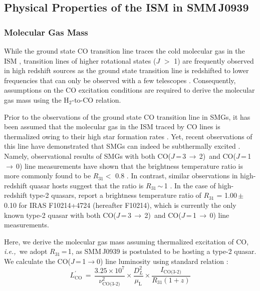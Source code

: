 \documentclass[twocolumn,apj,numberedappendix]{emulateapj}
\newcommand{\rarr}{$\rightarrow$}
\newcommand{\CO}{\mbox{CO($J$\,=\,3\,$\rightarrow$\,2) }}
\newcommand{\eg}{{\sl e.g.,~}}
\newcommand{\ie}{{\sl i.e.,~}}
\begin{document}
\subsection{Physical Properties of the ISM in SMM\,J0939}
\subsubsection{Molecular Gas Mass}
While the ground state CO transition line traces the cold molecular gas in the ISM
\citep*[\eg][]{Wilson70a,Downes98a}, transition lines of higher rotational states ($J$ $>$ 1) are frequently observed in high redshift sources as the
 ground state transition line is redshifted to lower frequencies that can only be observed with a few telescopes 
 \citep{Carilli13a}. Consequently, assumptions on the CO excitation conditions are required to derive the molecular gas mass using the H$_\textrm{2}$-to-CO 
 relation. \par
Prior to the observations of the ground state CO transition line in SMGs, it has been assumed that the molecular gas in the
  ISM traced by CO lines is thermalized owing to their high star formation rates \citep[\eg][]{Greve05a, Coppin08a}.
   Yet, recent observations of this line have demonstrated that SMGs can indeed be subthermally excited
   \citep{Harris10a,Riechers11c,Riechers11d,Ivison11a}. Namely, observational results of SMGs with both \CO and CO($J$\,=\,1\,\rarr\,0) line measurements have shown that the 
   brightness temperature ratio is more commonly found to be $R_\textrm{31}<$ 0.8 \citep
   {Harris10a,Carilli10a,Swinbank2010a,Ivison10d,Ivison11a,Riechers11d}. In contrast, similar observations in high-redshift quasar hosts suggest that the ratio 
   is $R_\textrm{31}$\,$\sim$\,1 \citep{Riechers06a, Riechers11a, Scott11a}. In the case of high-redshift type-2 quasars, \citet{Riechers11a} report a brightness temperature ratio of $R_\textrm{31}$ = 1.00\,$\pm$\,0.10 for IRAS F10214+4724 (hereafter F10214), which is currently the only known type-2 quasar with both \CO and CO($J$\,=\,1\,\rarr\,0) line measurements. \par
Here, we derive the molecular gas mass 
assuming thermalized excitation of CO, 
\ie we adopt $R_\textrm{31}$\,=\,1, as SMM\,J0939 is 
postulated to be hosting a type-2 quasar. 
We calculate the CO($J$\,=\,1\rarr0) line luminosity using standard relation 
\citep[\eg][]{Solomon05a,Carilli13a}:
\begin{equation}
L^{\prime}_\textrm{CO}\,=\,\frac{3.25\times10^7}{\nu_\textrm{CO(3-2)}^2}\times \frac{D_L^2}{\mu_\textrm{L}} \times
\frac{I_\textrm{CO(3-2)}} {R_\textrm{31} (1 + z)}
\end{equation}
\end{document}
